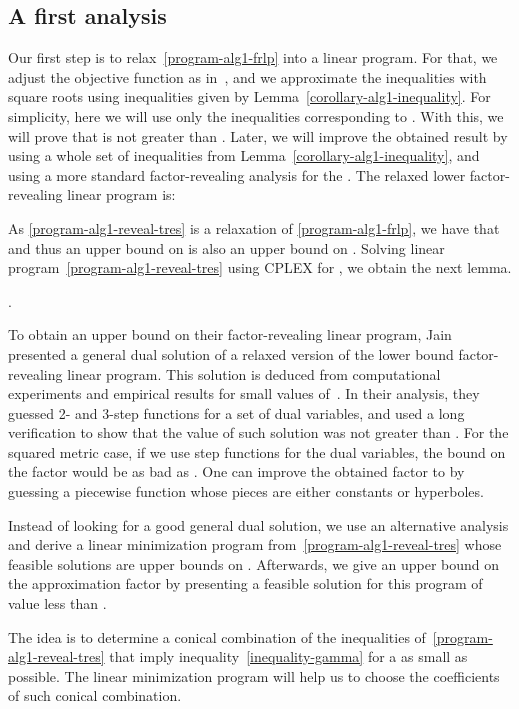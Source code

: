 \subsection{A first analysis}

Our first step is to relax~\eqref{program-alg1-frlp} into a linear
program. For that, we adjust the objective function as
in~\cite{JainMMSV03}, and we approximate the inequalities with square
roots using inequalities given by Lemma~\ref{corollary-alg1-inequality}. 
For simplicity, here we will use only the inequalities corresponding
to . With this, we will prove that  is not greater than \MAGIC{}.  Later, we
will improve the obtained result by using a whole set of inequalities
from Lemma~\ref{corollary-alg1-inequality}, and using a more standard
factor-revealing analysis for the \smflp. The relaxed lower
 factor-revealing linear program is:


As \eqref{program-alg1-reveal-tres} is a relaxation of
\eqref{program-alg1-frlp}, we have that  and thus
an upper bound on  is also an upper bound on
. Solving linear
program~\eqref{program-alg1-reveal-tres} using CPLEX for \MAGIC{}, we
obtain the next lemma.

\begin{lemma}\label{lemma-alg1-lower-tres}
.
\end{lemma}

To obtain an upper bound on their factor-revealing linear program,
Jain~\etal~\cite{JainMMSV03} presented a general dual solution of a
relaxed version of the lower bound factor-revealing linear
program. This solution is deduced from computational experiments and
empirical results for small values of~. In their analysis, they
guessed 2- and 3-step functions for a set of dual variables, and used
a long verification to show that the value of such solution was not
greater than . For the squared metric case, if we use step
functions for the dual variables, the bound on the factor would be as
bad as . One can improve the obtained factor to \MAGIC{}
by guessing a piecewise function whose pieces are either constants or
hyperboles.

Instead of looking for a good general dual solution, we use an alternative 
analysis and derive a linear minimization program from~\eqref{program-alg1-reveal-tres}
whose feasible solutions are upper bounds on . 
Afterwards, we give an upper bound on the approximation factor by 
presenting a feasible solution for this program of value less than 
\MAGIC{}.

The idea is to determine a conical combination of the inequalities
of~\eqref{program-alg1-reveal-tres} that imply
inequality~\eqref{inequality-gamma} for a  as small as possible.  The
linear minimization program will help us to choose the coefficients of such
conical combination.

